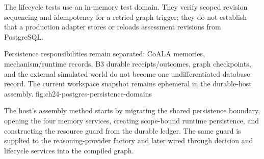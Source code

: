 The lifecycle tests use an in-memory test domain. They verify scoped revision sequencing and idempotency for a retried graph trigger; they do not establish that a production adapter stores or reloads assessment revisions from PostgreSQL.

  {Persistence responsibilities remain separated: CoALA memories, mechanism/runtime records, B3 durable receipts/outcomes, graph checkpoints, and the external simulated world do not become one undifferentiated database record. The current workspace snapshot remains ephemeral in the durable-host assembly.}
  {fig:ch24-postgres-persistence-domains}

The host's assembly method starts by migrating the shared persistence boundary, opening the four memory services, creating scope-bound runtime persistence, and constructing the resource guard from the durable ledger. The same guard is supplied to the reasoning-provider factory and later wired through decision and lifecycle services into the compiled graph.

